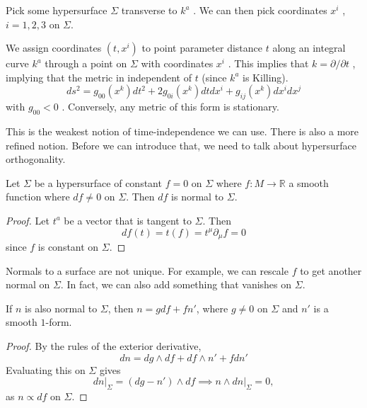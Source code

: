 Pick some hypersurface $\Sigma$ transverse to $k^{a}$ . We can then pick coordinates $x^{i}$ , $i = 1, 2, 3$ on  $\Sigma$.

 \begin{figure}[tbhp]
  \centering
  \def\svgwidth{0.4\columnwidth}
  
  \caption{}
  \label{fig:l1f1}
\end{figure} 

We assign coordinates $(t, x^{i})$  to point parameter distance $t$ along an integral curve  $k^{a}$  through a point on $\Sigma$ with coordinates  $x^{i}$ .
This implies that $k = \partial / \partial t$ , implying that  the metric in independent of $t$  (since $k^{a}$ is Killing).
\begin{equation}
  ds^2 = g_{00} (x^{k}) dt^2 + 2 g_{0i} (x^{k}) dt dx^{i} + g_{ij} (x^{k}) dx^{i} dx^{j}
\end{equation}
with $g_{00} < 0$ .
Conversely, any metric of this form is stationary.

This is the weakest notion of time-independence we can use. There is also a more refined notion. Before we can introduce that, we need to talk about hypersurface orthogonality.

 \begin{claim}
  Let $\Sigma$ be a hypersurface of constant $f = 0$ on $\Sigma$ where $f \colon M \to \mathbb{R}$ a smooth function where $df \neq 0$ on $\Sigma$.
  Then $df$ is normal to $\Sigma$.
\end{claim}
\begin{proof}
  Let $t^{a}$ be a vector that is tangent to $\Sigma$. Then
  \begin{equation}
    df(t) = t(f) = t^{\mu} \partial_{\mu} f = 0
  \end{equation}
  since $f$ is constant on $\Sigma$.
\end{proof}
\begin{leftbar}
  Normals to a surface are not unique. For example, we can rescale $f$ to get another normal on $\Sigma$.
  In fact, we can also add something that vanishes on $\Sigma$.
\end{leftbar}

\begin{claim}
  If $n$ is also normal to $\Sigma$, then $n = g df + f n'$, where $g \neq 0$ on $\Sigma$ and $n'$ is a smooth $1$-form.
\end{claim}
\begin{proof}
  By the rules of the exterior derivative,
  \begin{equation}
    dn = dg \wedge df + df \wedge n' + f dn'
  \end{equation}
  Evaluating this on $\Sigma$ gives
  \begin{equation}
    \left. dn \right\rvert_\Sigma = (dg - n') \wedge df \implies n \wedge dn \rvert_\Sigma = 0,
  \end{equation}
  as $n \propto df$ on $\Sigma$.
\end{proof}

